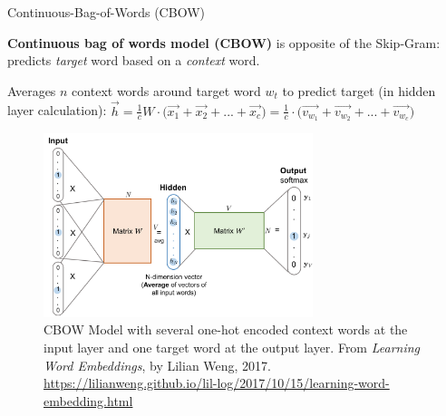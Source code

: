 \begin{frame}{Continuous-Bag-of-Words (CBOW)}\label{frame:CBOW}
    
    \begin{itemizeSpaced}{0pt}
        \pinkbox \textbf{Continuous bag of words model (CBOW)} is opposite of the Skip-Gram: predicts \emph{target} word based on a \emph{context} word. 
        
        \item Averages $n$ context words around target word $w_t$ to predict target (in hidden layer calculation): %
        $
        \overrightarrow{h} 
        = \frac{1}{c} W \cdot \Big(\overrightarrow{x_1} + \overrightarrow{x_2} + ... + \overrightarrow{x_c} \Big) 
        = \frac{1}{c} \cdot \Big(\overrightarrow{v_{w_1}} + \overrightarrow{v_{w_2}} + ... + \overrightarrow{v_{w_c}} \Big)
        $
        
    \end{itemizeSpaced}
    
    \begin{figure}[h] 
    \vspace{-5pt}
    \centering
    \includegraphics[width=0.7\textwidth]{imgs/cbow.png}
    \vspace{-5pt}
    \caption{\tiny CBOW Model with several one-hot encoded context words at the input layer and one target word at the output layer. From \emph{Learning Word Embeddings}, by Lilian Weng, 2017. \url{https://lilianweng.github.io/lil-log/2017/10/15/learning-word-embedding.html}}
    \label{fig:CBOW}
    \vspace{-5pt}
    \end{figure}
    
    
\end{frame}



